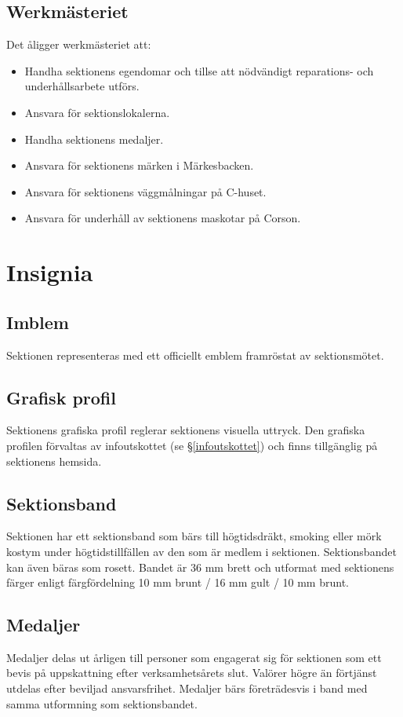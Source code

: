\documentclass{datateknologsektionen-document}
\begin{document}
\subsection{Werkmästeriet}
Det åligger werkmästeriet att:
\begin{itemize}
  \item Handha sektionens egendomar och tillse att nödvändigt reparations- och underhållsarbete utförs.
  \item Ansvara för sektionslokalerna.
  \item Handha sektionens medaljer.
  \item Ansvara för sektionens märken i Märkesbacken.
  \item Ansvara för sektionens väggmålningar på C-huset.
  \item Ansvara för underhåll av sektionens maskotar på Corson.
\end{itemize}

\section{Insignia}
\subsection{Imblem}
Sektionen representeras med ett officiellt emblem framröstat av sektionsmötet.

\subsection{Grafisk profil}
Sektionens grafiska profil reglerar sektionens visuella uttryck. Den grafiska
profilen förvaltas av infoutskottet (se \S \ref{infoutskottet}) och finns tillgänglig på sektionens hemsida.

\subsection{Sektionsband}
Sektionen har ett sektionsband som bärs till högtidsdräkt, smoking eller mörk kostym
under högtidstillfällen av den som är medlem i sektionen. Sektionsbandet kan även
bäras som rosett. Bandet är 36 mm brett och utformat med sektionens färger enligt
färgfördelning 10 mm brunt / 16 mm gult / 10 mm brunt.

\subsection{Medaljer}
Medaljer delas ut årligen till personer som engagerat sig för sektionen som ett
bevis på uppskattning efter verksamhetsårets slut. Valörer högre än förtjänst
utdelas efter beviljad ansvarsfrihet. Medaljer bärs företrädesvis i band med samma
utformning som sektionsbandet.
\end{document}
